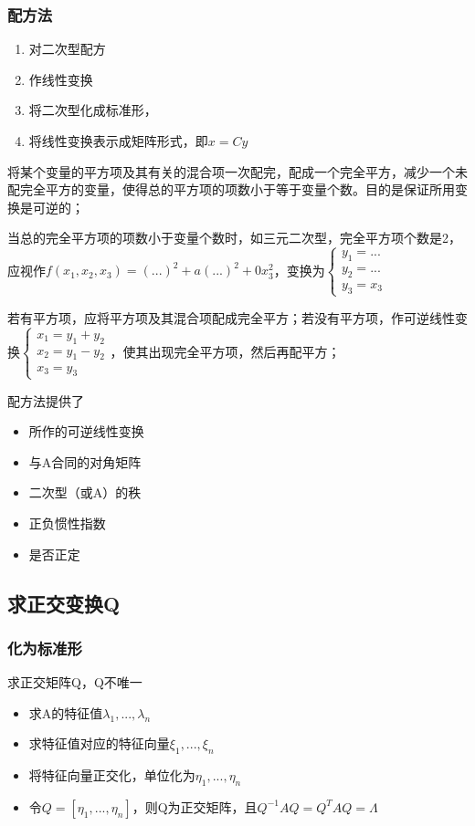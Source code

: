 \subsubsection{配方法}
\begin{enumerate}
    \item 对二次型配方
    \item 作线性变换
    \item 将二次型化成标准形，
    \item 将线性变换表示成矩阵形式，即\(x = Cy\)
\end{enumerate}

将某个变量的平方项及其有关的混合项一次配完，配成一个完全平方，减少一个未配完全平方的变量，使得总的平方项的项数小于等于变量个数。目的是保证所用变换是可逆的；

当总的完全平方项的项数小于变量个数时，如三元二次型，完全平方项个数是2，应视作\(f(x_1, x_2, x_3) = (...)^2 + a(...)^2 + 0x_3^2\)，变换为\(\begin{cases}
    y_1 = ... \\ 
    y_2 = ... \\ 
    y_3 = x_3
\end{cases}\)

若有平方项，应将平方项及其混合项配成完全平方；若没有平方项，作可逆线性变换\(\begin{cases}
    x_1 = y_1 + y_2 \\ 
    x_2 = y_1 - y_2 \\ 
    x_3 = y_3
\end{cases}\)，使其出现完全平方项，然后再配平方；

配方法提供了\begin{itemize}
    \item 所作的可逆线性变换
    \item 与A合同的对角矩阵
    \item 二次型（或A）的秩
    \item 正负惯性指数
    \item 是否正定
\end{itemize}


\subsection{求正交变换Q}

\subsubsection{化为标准形}
求正交矩阵Q，Q不唯一
\begin{itemize}
    \item 求A的特征值\(\lambda_1, ..., \lambda_n\)
    \item 求特征值对应的特征向量\(\xi_1, ..., \xi_n\)
    \item 将特征向量正交化，单位化为\(\eta_1, ..., \eta_n\)
    \item 令\(Q = [\eta_1, ..., \eta_n]\)，则Q为正交矩阵，且\(Q^{-1}AQ = Q^TAQ = \Lambda\)
\end{itemize}

